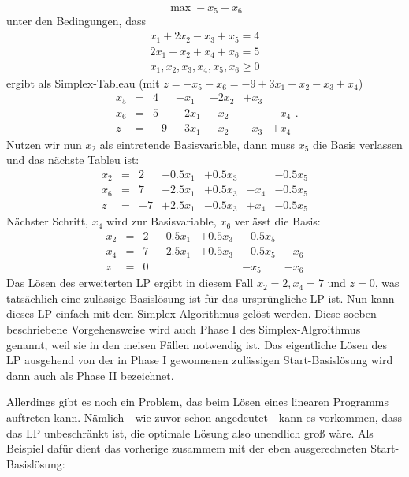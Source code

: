 \documentclass{article}
\begin{document}
\[
\max -x_5-x_6
\]unter den Bedingungen, dass\[
\begin{matrix}
x_1+2x_2-x_3+x_5=4\\2x_1-x_2+x_4+x_6=5\\x_1,x_2,x_3,x_4,x_5,x_6\geq0
\end{matrix}
\]ergibt als Simplex-Tableau (mit \(z=-x_5-x_6=-9+3x_1+x_2-x_3+x_4\))\[
\begin{matrix}
    x_5&=&4&-x_1&-2x_2&+x_3&\\
    x_6&=&5&-2x_1&+x_2&&-x_4\\
    \hline
    z&=&-9&+3x_1&+x_2&-x_3&+x_4
\end{matrix}.
\]Nutzen wir nun \(x_2\) als eintretende Basisvariable, dann muss \(x_5\) die Basis verlassen und das nächste Tableu ist:\[
\begin{matrix}
    x_2&=&2&-0.5x_1&+0.5x_3&&-0.5x_5\\
    x_6&=&7&-2.5x_1&+0.5x_3&-x_4&-0.5x_5\\
    \hline
    z&=&-7&+2.5x_1&-0.5x_3&+x_4&-0.5x_5
\end{matrix}
\]Nächster Schritt, \(x_4\) wird zur Basisvariable, \(x_6\) verlässt die Basis:\[
\begin{matrix}
    x_2&=&2&-0.5x_1&+0.5x_3&-0.5x_5&\\
    x_4&=&7&-2.5x_1&+0.5x_3&-0.5x_5&-x_6\\
    \hline
    z&=&0&&&-x_5&-x_6
\end{matrix}
\]
Das Lösen des erweiterten LP ergibt in diesem Fall \(x_2=2, x_4=7\) und \(z=0\), was tatsächlich eine zulässige Basislösung ist für das ursprüngliche LP ist. Nun kann dieses LP einfach mit dem Simplex-Algorithmus gelöst werden. Diese soeben beschriebene Vorgehensweise wird auch Phase I des Simplex-Algroithmus genannt, weil sie in den meisen Fällen notwendig ist. Das eigentliche Lösen des LP ausgehend von der in Phase I gewonnenen zulässigen Start-Basislösung wird dann auch als Phase II bezeichnet.

Allerdings gibt es noch ein Problem, das beim Lösen eines linearen Programms auftreten kann. Nämlich - wie zuvor schon angedeutet - kann es vorkommen, dass das LP unbeschränkt ist, die optimale Lösung also unendlich groß wäre. Als Beispiel dafür dient das vorherige zusammem mit der eben ausgerechneten Start-Basislösung:
\end{document}
